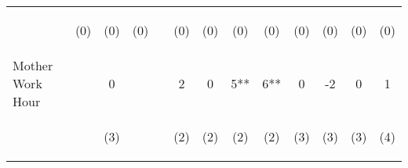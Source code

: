 \begin{tabular}{lcccccccccccc}
 & \begin{footnotesize}(0)\end{footnotesize} & \begin{footnotesize}(0)\end{footnotesize} & \begin{footnotesize}(0)\end{footnotesize} & \begin{footnotesize}\end{footnotesize} & \begin{footnotesize}(0)\end{footnotesize} & \begin{footnotesize}(0)\end{footnotesize} & \begin{footnotesize}(0)\end{footnotesize} & \begin{footnotesize}(0)\end{footnotesize} & \begin{footnotesize}(0)\end{footnotesize} & \begin{footnotesize}(0)\end{footnotesize} & \begin{footnotesize}(0)\end{footnotesize} & \begin{footnotesize}(0)\end{footnotesize}\\
\noalign{\smallskip}Mother Work Hour &  & 0 &  &  & 2 & 0 & 5** & 6** & 0 & -2 & 0 & 1\\
 & \begin{footnotesize}\end{footnotesize} & \begin{footnotesize}(3)\end{footnotesize} & \begin{footnotesize}\end{footnotesize} & \begin{footnotesize}\end{footnotesize} & \begin{footnotesize}(2)\end{footnotesize} & \begin{footnotesize}(2)\end{footnotesize} & \begin{footnotesize}(2)\end{footnotesize} & \begin{footnotesize}(2)\end{footnotesize} & \begin{footnotesize}(3)\end{footnotesize} & \begin{footnotesize}(3)\end{footnotesize} & \begin{footnotesize}(3)\end{footnotesize} & \begin{footnotesize}(4)\end{footnotesize}\\

\end{tabular}
